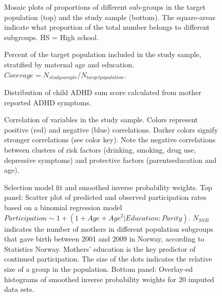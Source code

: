 \documentclass[12pt]{article}
\begin{document}
\begin{figure}[H]
	\centering
	
	\caption{\footnotesize Mosaic plots of proportions of different sub-groups in the target population (top) and the study sample (bottom). The square-areas indicate what proportion of the total number belongs to different subgroups. HS = High school.}
	\label{fig:prop_moba_ssb}
\end{figure}

\begin{figure}[H]
	\centering
	
	\caption{\footnotesize Percent of the target population included in the study sample, stratified by maternal age and education. $Coverage = N_{study sample}/N_{target population}$.}
	\label{fig:coverage}
\end{figure}


\begin{figure}[H]
	\centering
	
	\caption{\footnotesize Distribution of child ADHD sum score calculated from mother reported ADHD symptoms.}
	\label{fig:ADHDsumscore}
\end{figure}

\begin{figure}[H]
	\centering 
	\caption{Correlation of variables in the study sample. Colors represent positive (red) and negative (blue) correlations. Darker colors signify stronger correlations (see color key). Note the negative correlations between clusters of risk factors (drinking, smoking, drug use, depressive symptoms) and protective factors (parents\textquotesingle \space education and age).}
	\label{fig:covariation}
\end{figure}


\begin{figure}[H]
	\centering
	\resizebox{.44\textheight}{!}{
		
	}
    	
	\caption{Selection model fit and smoothed inverse probability weights. Top panel: Scatter plot of predicted and observed participation rates based on a binomial regression model $Participation \sim 1 + (1 + Age + Age^2 | Education:Parity)$. $N_{SSB}$ indicates the number of mothers in different population subgroups that gave birth between 2001 and 2009 in Norway, according to Statistics Norway. Mothers' education is the key predictor of continued participation. The size of the dots indicates the relative size of a group in the population. Bottom panel: Overlay-ed histograms of smoothed inverse probability weights for 20 imputed data sets.}
	\label{fig:IPW}
\end{figure}
\end{document}
